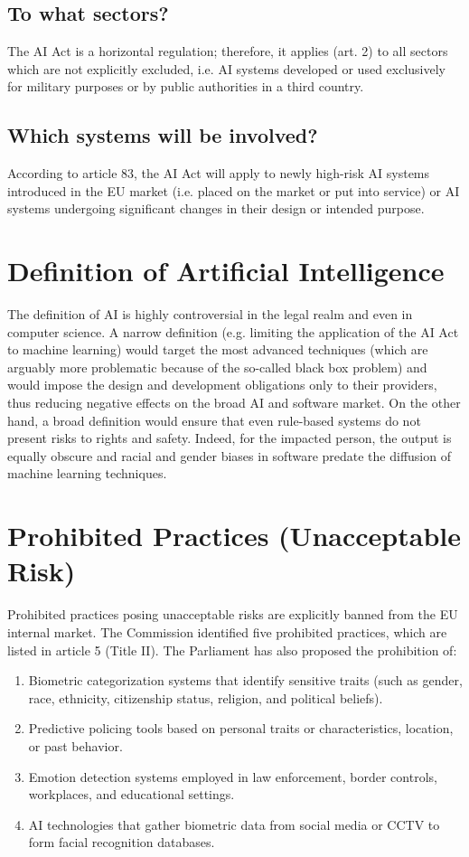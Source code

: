 \subsection{To what sectors?}
The AI Act is a horizontal regulation; therefore, it applies (art. 2) to all sectors which are not explicitly excluded, i.e. AI systems developed or used exclusively for military purposes or by public authorities in a third country.

\subsection{Which systems will be involved?}
According to article 83, the AI Act will apply to newly high-risk AI systems introduced in the EU market (i.e. placed on the market or put into service) or AI systems undergoing significant changes in their design or intended purpose.

\section{Definition of Artificial Intelligence}
The definition of AI is highly controversial in the legal realm and even in computer science. A narrow definition (e.g. limiting the application of the AI Act to machine learning) would target the most advanced techniques (which are arguably more problematic because of the so-called black box problem) and would impose the design and development obligations only to their providers, thus reducing negative effects on the broad AI and software market.
\newline
On the other hand, a broad definition would ensure that even rule-based systems do not present risks to rights and safety. Indeed, for the impacted person, the output is equally obscure and racial and gender biases in software predate the diffusion of machine learning techniques.

\section{Prohibited Practices (Unacceptable Risk)} \label{sec:Unacceptable-risk}
Prohibited practices posing unacceptable risks are explicitly banned from the EU internal market. The Commission identified five prohibited practices, which are listed in article 5 (Title II). The Parliament has also proposed the prohibition of:
\begin{enumerate}[label=(\roman*)]
    \item Biometric categorization systems that identify sensitive traits (such as gender, race, ethnicity, citizenship status, religion, and political beliefs).
    \item Predictive policing tools based on personal traits or characteristics, location, or past behavior.
    \item Emotion detection systems employed in law enforcement, border controls, workplaces, and educational settings.
    \item AI technologies that gather biometric data from social media or CCTV to form facial recognition databases.
\end{enumerate}

